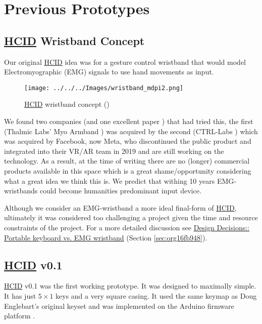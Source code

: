 \documentclass[logo,bsc,singlespacing,parskip]{infthesis}
\begin{document}
\chapter{Previous Prototypes}
\label{sec:org3c4c93e}
\section{\hyperref[org0c83164]{HCID} Wristband Concept}
\label{sec:orgbfe155b}
Our original \hyperref[org0c83164]{HCID} idea was for a gesture control wristband that would model Electromyographic (EMG) signals to use hand movements as input.

\begin{figure}[h]
\centering
\texttt{[image: ../../../Images/wristband\_mdpi2.png]}
\caption{\hyperref[org0c83164]{HCID} wristband concept (\autocite{cote-allardLowCostWireless3DPrinted2019})}
\end{figure}

We found two companies (and one excellent paper \autocite{cote-allardLowCostWireless3DPrinted2019}) that had tried this, the first (Thalmic Labs' Myo Armband \autocite{MyoGestureControl}) was acquired by the second (CTRL-Labs \autocite{27CTRLlabsLinkedIn}) which was acquired by Facebook, now Meta, who discontinued the public product and integrated into their VR/AR team in 2019 and are still working on the technology.
As a result, at the time of writing there are no (longer) commercial products available in this space which is a great shame/opportunity considering what a great idea we think this is.
We predict that withing 10 years EMG-wristbands could become humanities predominant input device.

Although we consider an EMG-wristband a more ideal final-form of \hyperref[org0c83164]{HCID}, ultimately it was considered too challenging a project given the time and resource constraints of the project. For a more detailed discussion see \hyperref[sec:org16fb948]{Design Decisions:: Portable keyboard vs. EMG wristband} (Section \ref{sec:org16fb948}).
\section{\hyperref[org0c83164]{HCID} v0.1}
\label{sec:org148afbc}
\hyperref[org0c83164]{HCID} v0.1
was the first working prototype.
It was designed to maximally simple.
It has just \(5\times1\) keys and a very square casing.
It used the same keymap as Doug Englebart's original keyset and was implemented on the Arduino firmware platform \autocite{ArduinoHome}.
\end{document}
